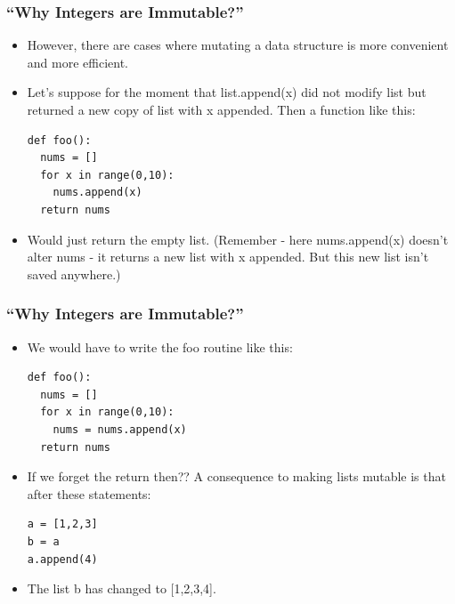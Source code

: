 \begin{frame}[fragile]\frametitle{``Why Integers are Immutable?'' }
    \begin{itemize}
    \item However, there are cases where mutating a data structure is more convenient and more efficient. 
    \item Let's suppose for the moment that list.append(x) did not modify list but returned a new copy of list with x appended. Then a function like this:
        \begin{lstlisting}
def foo():
  nums = []
  for x in range(0,10):
    nums.append(x)
  return nums
\end{lstlisting}
\item Would just return the empty list. (Remember - here nums.append(x) doesn't alter nums - it returns a new list with x appended. But this new list isn't saved anywhere.)
            \end{itemize}
            
\end{frame}


\begin{frame}[fragile]\frametitle{``Why Integers are Immutable?'' }
    \begin{itemize}
    \item We would have to write the foo routine like this:
        \begin{lstlisting}
def foo():
  nums = []
  for x in range(0,10):
    nums = nums.append(x)
  return nums
\end{lstlisting}
\item If we forget the return then?? A consequence to making lists mutable is that after these statements:
        \begin{lstlisting}
a = [1,2,3]
b = a
a.append(4)
\end{lstlisting}
\item The list b has changed to [1,2,3,4].
            \end{itemize}
            
\end{frame}

